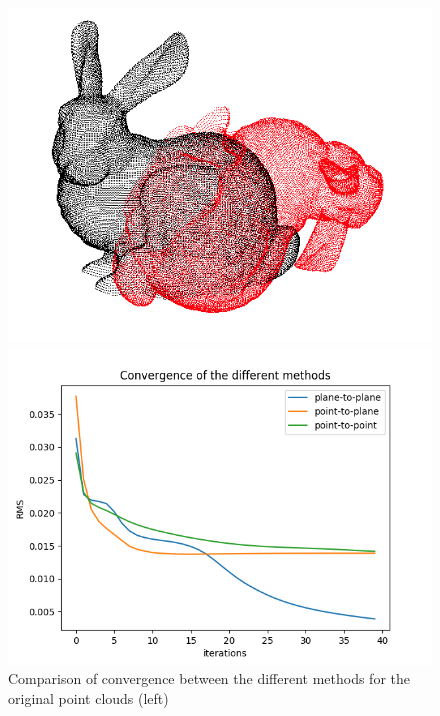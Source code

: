 \documentclass[11pt,letterpaper,leqno]{article}
\begin{document}
\begin{figure}[ht!]
    \centering
    \begin{minipage}{0.5\linewidth}
    \includegraphics[width=\linewidth]{img/comparison_2_cloud.png}
    \end{minipage}\hfill
    \begin{minipage}{0.5\linewidth}
    \includegraphics[width=\linewidth]{img/comparison_2.png}
    \end{minipage}
    \caption{Comparison of convergence between the different methods for the original point clouds (left)}
    \label{fig:comp2}
\end{figure}
\end{document}
